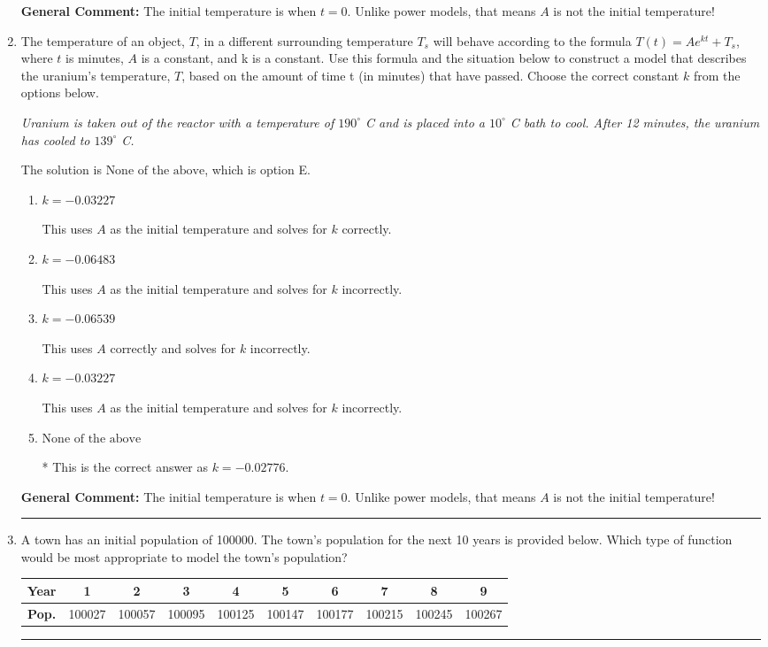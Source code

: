 \documentclass{extbook}[14pt]
\newcommand{\litem}[1]{\item #1

\rule{\textwidth}{0.4pt}}
\begin{document}
\begin{enumerate}
{\textbf{General Comment:} The initial temperature is when $t = 0$. Unlike power models, that means $A$ is not the initial temperature!
}
\litem{
The temperature of an object, $T$, in a different surrounding temperature $T_s$ will behave according to the formula $T(t) = Ae^{kt} + T_s$, where $t$ is minutes, $A$ is a constant, and k is a constant. Use this formula and the situation below to construct a model that describes the uranium's temperature, $T$, based on the amount of time t (in minutes) that have passed. Choose the correct constant $k$ from the options below.

\begin{center}
    \textit{ Uranium is taken out of the reactor with a temperature of $190^{\circ}$ C and is placed into a $10^{\circ}$ C bath to cool. After 12 minutes, the uranium has cooled to $139^{\circ}$ C. }
\end{center}


The solution is \( \text{None of the above} \), which is option E.\begin{enumerate}[label=\Alph*.]
\item \( k = -0.03227 \)

This uses $A$ as the initial temperature and solves for $k$ correctly.
\item \( k = -0.06483 \)

This uses $A$ as the initial temperature and solves for $k$ incorrectly.
\item \( k = -0.06539 \)

This uses $A$ correctly and solves for $k$ incorrectly.
\item \( k = -0.03227 \)

This uses $A$ as the initial temperature and solves for $k$ incorrectly.
\item \( \text{None of the above} \)

* This is the correct answer as $k = -0.02776$.
\end{enumerate}

\textbf{General Comment:} The initial temperature is when $t = 0$. Unlike power models, that means $A$ is not the initial temperature!
}
\litem{
A town has an initial population of 100000. The town's population for the next 10 years is provided below. Which type of function would be most appropriate to model the town's population?



\begin{tabular}{c|c|c|c|c|c|c|c|c|c}
\textbf{Year} & 1 & 2 & 3 & 4 & 5 & 6 & 7 & 8 & 9 \tabularnewline
\hline
\textbf{Pop.} & 100027 & 100057 & 100095 & 100125 & 100147 & 100177 & 100215 & 100245 & 100267
\end{tabular} 

}
\end{enumerate}
\end{document}
